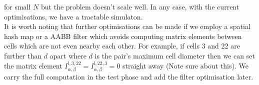 for small $N$ but the problem doesn't scale well. In any case, with the current optimisations, we have a tractable simulaton.
\\
It is worth noting that further optimisations can be made if we employ a spatial hash map or a AABB filter which avoids computing matrix elements 
between cells which are not even nearby each other. For example, if cells $3$ and $22$ are further than $d$ apart where $d$ is the pair's maximum cell diameter
then we can set the matrix element $I_{\alpha, \beta}^{l,3,22} =I_{\alpha, \beta}^{l,22,3} = 0$ straight away (Note sure about this). We carry the full computation 
in the test phase and add the filter optimisation later.
\\
\\










